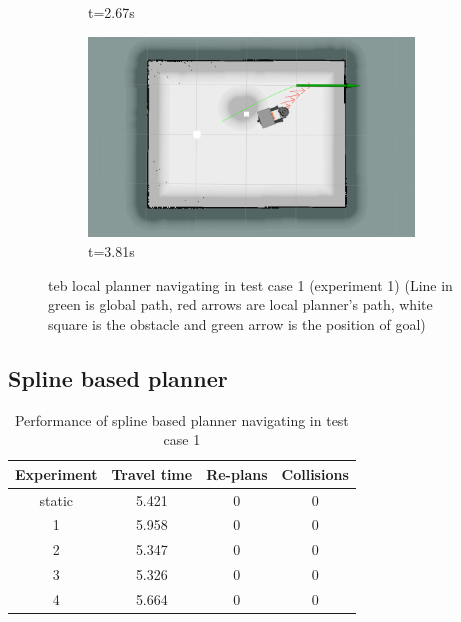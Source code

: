 \begin{figure}[H]
\begin{subfigure}[b]{0.50\linewidth}
        \caption{t=2.67s}
    \end{subfigure}%
    \begin{subfigure}[b]{0.50\linewidth}
        \centering
        \includegraphics[width=0.95\textwidth]{images/teb_single_1_obs/1/5381.png}
        \caption{t=3.81s}
    \end{subfigure}
    \caption{teb local planner navigating in test case 1 (experiment 1) (Line in green is
        global path, red arrows are local planner's path, white square is the obstacle and green arrow
        is the position of goal)}\label{fig:teb_test_case_1_exp_1}
\end{figure}

\subsection{Spline based planner}%
\label{sub:eval_spline_based_planner}

\begin{table}[H]
    \centering
    \begin{tabular}{cccc}
        \textbf{Experiment} & \textbf{Travel time} & \textbf{Re-plans} & \textbf{Collisions} \\\toprule
        static & 5.421 & 0 & 0 \\
             1 & 5.958 & 0 & 0 \\
             2 & 5.347 & 0 & 0 \\
             3 & 5.326 & 0 & 0 \\
             4 & 5.664 & 0 & 0 \\
    \end{tabular}
    \caption{Performance of spline based planner navigating in test case 1}\label{tab:perfomance_spline_test_case_1}
\end{table}

